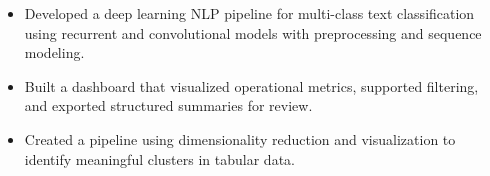 \documentclass[10pt,a4paper]{altacv}
\begin{document}
\medskip




\begin{itemize}
  \item Developed a deep learning NLP pipeline for multi-class text classification using recurrent and convolutional models with preprocessing and sequence modeling.
\end{itemize}


\begin{itemize}
  \item Built a dashboard that visualized operational metrics, supported filtering, and exported structured summaries for review.
\end{itemize}


\begin{itemize}
  \item Created a pipeline using dimensionality reduction and visualization to identify meaningful clusters in tabular data.
\end{itemize}
\end{document}
